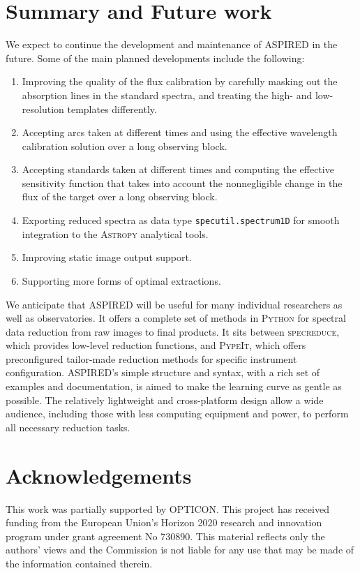 \documentclass[linenumbers, twocolumn]{aastex631}
\begin{document}
\section{Summary and Future work}
\label{sec:summary}

We expect to continue the development and maintenance of \textsc{ASPIRED} in the
future. Some of the main planned developments include the following:
\begin{enumerate}
    \item Improving the quality of the flux calibration by
    carefully masking out the absorption lines in the standard spectra, and
    treating the high- and low-resolution templates differently.
    \item Accepting arcs taken at different times and using the effective wavelength
    calibration solution over a long observing block.
    \item Accepting standards taken at different times and computing the effective
    sensitivity function that takes into account the nonnegligible change
    in the flux of the target over a long observing block.
    \item Exporting reduced spectra as data type \texttt{specutil.spectrum1D}
    for smooth integration to the \textsc{Astropy} analytical tools.
    \item Improving static image output support.
    \item Supporting more forms of optimal extractions.
\end{enumerate}

We anticipate that ASPIRED will be useful for many individual researchers as
well as observatories. It offers a complete set of methods in \textsc{Python}
for spectral data reduction from raw images to final products. It sits between
\textsc{specreduce}, which provides low-level reduction functions, and 
\textsc{PypeIt}, which offers preconfigured tailor-made reduction methods for
specific instrument configuration. \textsc{ASPIRED}'s simple structure and
syntax, with a rich set of examples and documentation, is aimed to make the
learning curve as gentle as possible. The relatively lightweight and
cross-platform design allow a wide audience, including those with less
computing equipment and power, to perform all necessary reduction tasks.


\section*{Acknowledgements}
This work was partially supported by OPTICON. This project has
received funding from the European Union's Horizon 2020 research and
innovation program under grant agreement No 730890. This material
reflects only the authors' views and the Commission is not liable for
any use that may be made of the information contained therein.
\end{document}
